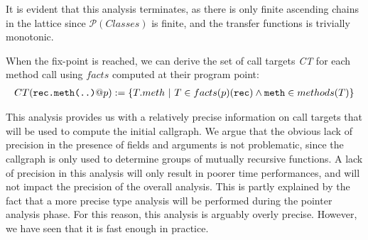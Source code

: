 It is evident that this analysis terminates, as there is only finite ascending
chains in the lattice since $\mathcal{P}(Classes)$ is finite, and the transfer functions
is trivially monotonic.

When the fix-point is reached, we can derive the set of call targets \emph{CT}
for each method call using $facts$ computed at their program point:
\begin{eqnarray*}
    CT(\verb/rec.meth(..)/ @ p) := \{ T.meth ~|~ T \in facts(p)(\verb/rec/) \land \verb/meth/ \in methods(T) \}
\end{eqnarray*}

This analysis provides us with a relatively precise information on call targets
that will be used to compute the initial callgraph. We argue that the obvious
lack of precision in the presence of fields and arguments is not problematic,
since the callgraph is only used to determine groups of mutually recursive
functions. A lack of precision in this analysis will only result in poorer time
performances, and will not impact the precision of the overall analysis. This
is partly explained by the fact that a more precise type analysis will be
performed during the pointer analysis phase. For this reason, this analysis is
arguably overly precise. However, we have seen that it is fast enough in
practice.
